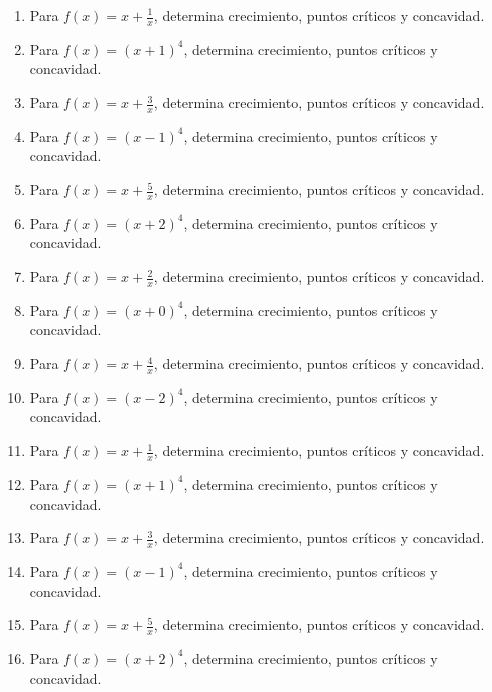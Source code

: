 \documentclass[11pt,a4paper]{article}
\begin{document}
\begin{enumerate}[label=\textbf{E\arabic*.},start=141]

\item Para $f(x)=x+\frac{1}{x}$, determina crecimiento, puntos críticos y concavidad.

\item Para $f(x)=(x+1)^4$, determina crecimiento, puntos críticos y concavidad.

\item Para $f(x)=x+\frac{3}{x}$, determina crecimiento, puntos críticos y concavidad.

\item Para $f(x)=(x-1)^4$, determina crecimiento, puntos críticos y concavidad.

\item Para $f(x)=x+\frac{5}{x}$, determina crecimiento, puntos críticos y concavidad.

\item Para $f(x)=(x+2)^4$, determina crecimiento, puntos críticos y concavidad.

\item Para $f(x)=x+\frac{2}{x}$, determina crecimiento, puntos críticos y concavidad.

\item Para $f(x)=(x+0)^4$, determina crecimiento, puntos críticos y concavidad.

\item Para $f(x)=x+\frac{4}{x}$, determina crecimiento, puntos críticos y concavidad.

\item Para $f(x)=(x-2)^4$, determina crecimiento, puntos críticos y concavidad.

\item Para $f(x)=x+\frac{1}{x}$, determina crecimiento, puntos críticos y concavidad.

\item Para $f(x)=(x+1)^4$, determina crecimiento, puntos críticos y concavidad.

\item Para $f(x)=x+\frac{3}{x}$, determina crecimiento, puntos críticos y concavidad.

\item Para $f(x)=(x-1)^4$, determina crecimiento, puntos críticos y concavidad.

\item Para $f(x)=x+\frac{5}{x}$, determina crecimiento, puntos críticos y concavidad.

\item Para $f(x)=(x+2)^4$, determina crecimiento, puntos críticos y concavidad.


\end{enumerate}
\end{document}
